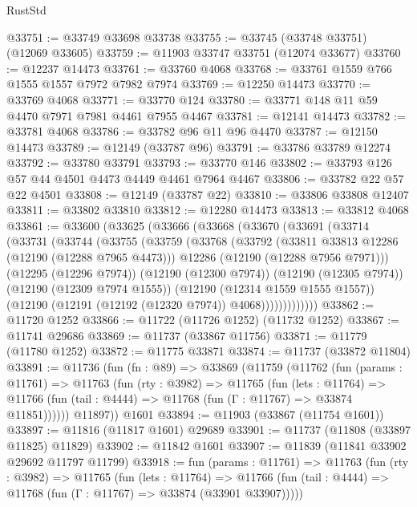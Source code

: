 \begin{lexlean}{RustStd}
\begin{coremodule}
@33751 := @33749 @33698 @33738
@33755 := @33745 (@33748 @33751) (@12069 @33605)
@33759 := @11903 @33747 @33751 (@12074 @33677)
@33760 := @12237 @14473
@33761 := @33760 @4068
@33768 := @33761 @1559 @766 @1555 @1557 @7972 @7982 @7974
@33769 := @12250 @14473
@33770 := @33769 @4068
@33771 := @33770 @124
@33780 := @33771 @148 @11 @59 @4470 @7971 @7981 @4461 @7955 @4467
@33781 := @12141 @14473
@33782 := @33781 @4068
@33786 := @33782 @96 @11 @96 @4470
@33787 := @12150 @14473
@33789 := @12149 (@33787 @96)
@33791 := @33786 @33789 @12274
@33792 := @33780 @33791
@33793 := @33770 @146
@33802 := @33793 @126 @57 @44 @4501 @4473 @4449 @4461 @7964 @4467
@33806 := @33782 @22 @57 @22 @4501
@33808 := @12149 (@33787 @22)
@33810 := @33806 @33808 @12407
@33811 := @33802 @33810
@33812 := @12280 @14473
@33813 := @33812 @4068
@33861 := @33600
    (@33625
      (@33666
        (@33668
          (@33670
            (@33691
              (@33714
                (@33731
                  (@33744
                    (@33755
                      (@33759
                        (@33768
                          (@33792
                            (@33811 @33813 @12286 (@12190 (@12288 @7965 @4473)))
                            @12286
                            (@12190 (@12288 @7956 @7971)))
                          (@12295 (@12296 @7974))
                          (@12190 (@12300 @7974))
                          (@12190 (@12305 @7974))
                          (@12190 (@12309 @7974 @1555))
                          (@12190 (@12314 @1559 @1555 @1557))
                          (@12190 (@12191 (@12192 (@12320 @7974)) @4068)))))))))))))
@33862 := @11720 @1252
@33866 := @11722 (@11726 @1252) (@11732 @1252)
@33867 := @11741 @29686
@33869 := @11737 (@33867 @11756)
@33871 := @11779 (@11780 @1252)
@33872 := @11775 @33871
@33874 := @11737 (@33872 @11804)
@33891 := @11736
    (fun (fn : @89) =>
    @33869
      (@11759
        (@11762
          (fun (params : @11761) =>
          @11763
            (fun (rty : @3982) =>
            @11765
              (fun (lets : @11764) =>
              @11766 (fun (tail : @4444) => @11768 (fun (Γ : @11767) => @33874 @11851))))))
        @11897))
    @1601
@33894 := @11903 (@33867 (@11754 @1601))
@33897 := @11816 (@11817 @1601) @29689
@33901 := @11737 (@11808 (@33897 @11825) @11829)
@33902 := @11842 @1601
@33907 := @11839 (@11841 @33902 @29692 @11797 @11799)
@33918 := fun (params : @11761) =>
  @11763
    (fun (rty : @3982) =>
    @11765
      (fun (lets : @11764) =>
      @11766 (fun (tail : @4444) => @11768 (fun (Γ : @11767) => @33874 (@33901 @33907)))))

\end{coremodule}
\end{lexlean}

